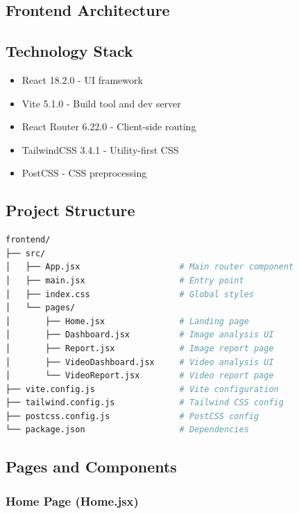 \documentclass[12pt,a4paper]{book}
\begin{document}
\begin{itemize}
\chapter{Frontend Architecture}
\label{ch:frontend}

\section{Technology Stack}

\begin{itemize}
    \item React 18.2.0 - UI framework
    \item Vite 5.1.0 - Build tool and dev server
    \item React Router 6.22.0 - Client-side routing
    \item TailwindCSS 3.4.1 - Utility-first CSS
    \item PostCSS - CSS preprocessing
\end{itemize}

\section{Project Structure}

\begin{lstlisting}[language=bash]
frontend/
├── src/
│   ├── App.jsx                    # Main router component
│   ├── main.jsx                   # Entry point
│   ├── index.css                  # Global styles
│   └── pages/
│       ├── Home.jsx               # Landing page
│       ├── Dashboard.jsx          # Image analysis UI
│       ├── Report.jsx             # Image report page
│       ├── VideoDashboard.jsx     # Video analysis UI
│       └── VideoReport.jsx        # Video report page
├── vite.config.js                 # Vite configuration
├── tailwind.config.js             # Tailwind CSS config
├── postcss.config.js              # PostCSS config
└── package.json                   # Dependencies
\end{lstlisting}

\section{Pages and Components}

\subsection{Home Page (Home.jsx)}


\end{itemize}
\end{document}
